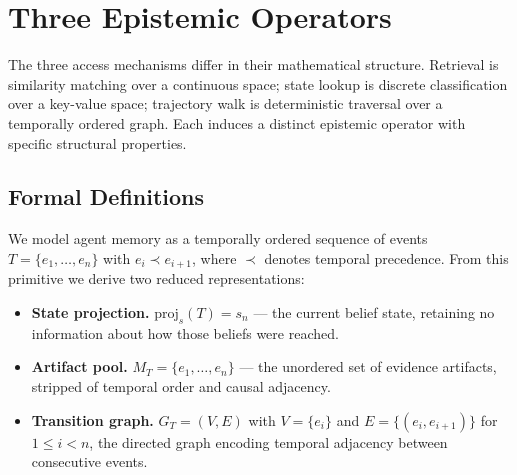 \documentclass[letterpaper,twocolumn,10pt]{article}
\begin{document}
\section{Three Epistemic Operators}
\label{sec:operators}

The three access mechanisms differ in their mathematical structure. Retrieval is similarity matching over a continuous space; state lookup is discrete classification over a key-value space; trajectory walk is deterministic traversal over a temporally ordered graph. Each induces a distinct epistemic operator with specific structural properties.

\subsection{Formal Definitions}
We model agent memory as a temporally ordered sequence of events $T = \{e_1,\dots,e_n\}$ with $e_i \prec e_{i+1}$, where $\prec$ denotes temporal precedence. From this primitive we derive two reduced representations:

\begin{itemize}
\item \textbf{State projection.} $\mathrm{proj}_s(T) = s_n$ --- the current belief state, retaining no information about how those beliefs were reached.
\item \textbf{Artifact pool.} $M_T = \{e_1,\dots,e_n\}$ --- the unordered set of evidence artifacts, stripped of temporal order and causal adjacency.
\item \textbf{Transition graph.} $G_T = (V,E)$ with $V = \{e_i\}$ and $E = \{(e_i,e_{i+1})\}$ for $1 \leq i < n$, the directed graph encoding temporal adjacency between consecutive events.
\end{itemize}

\begin{table}[t]
\caption{Three representations and their induced epistemic operators.}
\centering
{}
\end{table}
\end{document}

